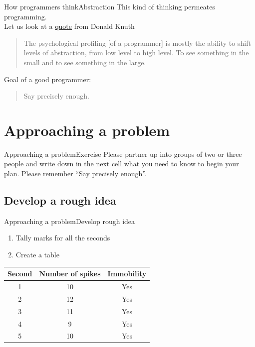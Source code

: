 \documentclass[aspectratio=169]{beamer}
\begin{document}
\begin{frame}{How programmers think}{Abstraction}
This kind of thinking permeates programming. \\

Let us look at a \href{https://en.wikiquote.org/wiki/Donald_Knuth}{quote} from Donald Knuth

\begin{quote}
The psychological profiling [of a programmer] is mostly the ability to shift levels of abstraction,
from low level to high level.
To see something in the small and to see something in the large.
\end{quote}

\pause

Goal of a good programmer:
\begin{quote}
	\centering
	Say precisely enough.
\end{quote}
\end{frame}

\section{Approaching a problem}
\begin{frame}{Approaching a problem}{Exercise}
Please partner up into groups of two or three people and write down in the next cell
what you need to know to begin your plan.
Please remember “Say precisely enough”.
\end{frame}

\subsection{Develop a rough idea}
\begin{frame}{Approaching a problem}{Develop rough idea}
\begin{enumerate}
	\item Tally marks for all the seconds
	\item Create a table
\end{enumerate}

\begin{table}[h]
\center
\begin{tabular}{ccc}
\toprule
Second & Number of spikes & Immobility \\
\midrule
1 & 10 & Yes \\
2 & 12 & Yes \\
3 & 11 & Yes \\
4 & 9 & Yes \\
5 & 10 & Yes \\
\bottomrule
\end{tabular}
\end{table}
\end{frame}
\end{document}
